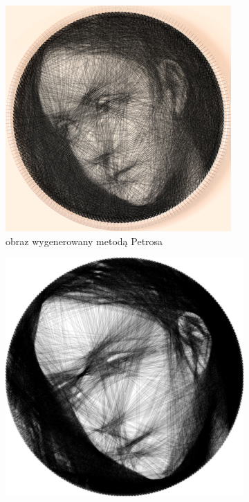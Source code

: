\documentclass[a4paper, 12pt, polish, twoside]{extreport}
\begin{document}
\begin{figure}[H]
\begin{subfigure}{0.32\textwidth}
        \includegraphics[width = \textwidth]{img/6-comp/magdalene_petros_.jpg}
        \caption{obraz wygenerowany metodą Petrosa}
        \label{comp-comp-magdalene-b}
    \end{subfigure}
    \begin{subfigure}{0.32\textwidth}
        \centering
        \includegraphics[width = \textwidth]{img/6-comp/magdalene_birsak_.png}

\end{subfigure}
\end{figure}
\end{document}
